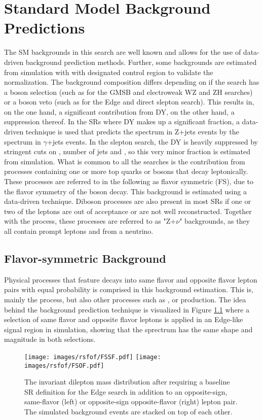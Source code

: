 \chapter{Standard Model Background Predictions}\label{sec:backgrounds}
The SM backgrounds in this search are well known and allows for the use of data-driven background prediction methods. 
Further, some backgrounds are estimated from simulation with with designated control region to validate the normalization. 
The background composition differs depending on if the search has a \PZ boson selection (such as for the GMSB and electroweak WZ and ZH searches) or a \PZ boson veto (such as for the Edge and direct slepton search). 
This results in, on the one hand, a significant contribution from DY, on the other hand, a suppression thereof. 
In the SRs where DY makes up a significant fraction, a data-driven technique is used that predicts the \ptmiss spectrum in Z+jets events by the \ptmiss spectrum in $\gamma$+jets events. 
In the slepton search, the DY is heavily suppressed by stringent cuts on \ptmiss, number of jets and \mttwo, so this very minor fraction is estimated from simulation.  
What is common to all the searches is the contribution from processes containing one or more top quarks or \PW bosons that decay leptonically. 
These processes are referred to in the following as flavor symmetric (FS), due to the flavor symmetry of the \PW boson decay. 
This background is estimated using a data-driven technique. 
Diboson processes are also present in most SRs if one or two of the leptons are out of acceptance or are not well reconstructed. 
Together with the \ttZ process, these processes are referred to as "Z+$\nu$" backgrounds, as they all contain prompt leptons and \ptmiss from a neutrino.   
\section{Flavor-symmetric Background}\label{sec:fsBG}
Physical processes that feature decays into same flavor and opposite flavor lepton pairs with equal probability is comprised in this background estimation. 
This is, mainly the \ttbar process, but also other processes such as \PWW, or \ttW production.
The idea behind the background prediction technique is visualized in Figure \ref{fig:rsfofMC} where a selection of same flavor and opposite flavor leptons is applied in an Edge-like signal region in simulation, showing that the \ttbar sprectrum has the same shape and magnitude in both selections.    

\begin{figure}[htbp!]
\begin{center}
    \texttt{[image: images/rsfof/FSSF.pdf]}
    \texttt{[image: images/rsfof/FSOF.pdf]} 
    \caption{The invariant dilepton mass distribution after requiring a baseline SR definition for the Edge search in addition to an opposite-sign, same-flavor (left) or opposite-sign opposite-flavor (right) lepton pair. The simulated background events are stacked on top of each other.}
\label{fig:rsfofMC}
\end{center}
\end{figure}                                                                               

